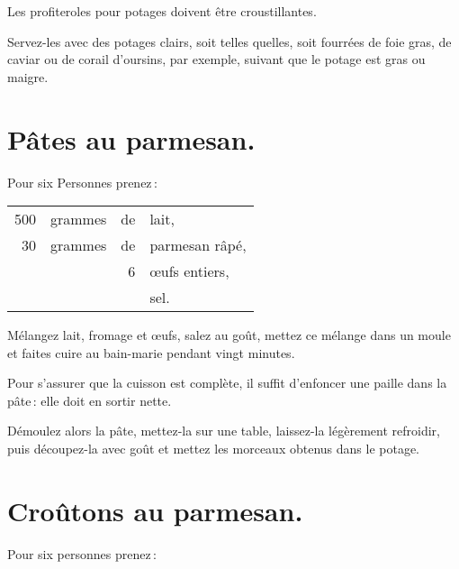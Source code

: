 Les profiteroles pour potages doivent être croustillantes.

Servez-les avec des potages clairs, soit telles quelles, soit fourrées de foie
gras, de caviar ou de corail d'oursins, par exemple, suivant que le potage est
gras ou maigre.

\section*{\centering Pâtes au parmesan.}

Pour six Personnes prenez :

\medskip

\footnotesize
\begin{longtable}{rrrp{16em}}                                                    
    500 & grammes & de & lait,                                                                            \\
     30 & grammes & de & parmesan râpé,                                                                   \\
        &         &  6 & œufs entiers,                                                                    \\
        &         &    & sel.                                                                             \\
\end{longtable}
\normalsize               

Mélangez lait, fromage et œufs, salez au goût, mettez ce mélange dans un moule
et faites cuire au bain-marie pendant vingt minutes.

Pour s'assurer que la cuisson est complète, il suffit d'enfoncer une paille dans
la pâte : elle doit en sortir nette.

Démoulez alors la pâte, mettez-la sur une table, laissez-la légèrement refroidir,
puis découpez-la avec goût et mettez les morceaux obtenus dans le potage.

\section*{\centering Croûtons au parmesan.}
{}
\label{pg0259} \hypertarget{p0259}{}

Pour six personnes prenez :

\smallskip

